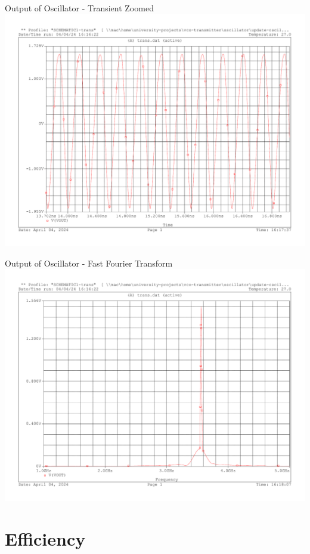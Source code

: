 \documentclass{beamer}
\begin{document}
\begin{frame}{Output of Oscillator - Transient Zoomed}
\includegraphics[width=\linewidth]{images/osc_out_zoom.pdf}

\end{frame}

\begin{frame}{Output of Oscillator - Fast Fourier Transform}
\includegraphics[width=\linewidth]{images/osc_out_fft.pdf}

\end{frame}


\section{Efficiency}
\end{document}
